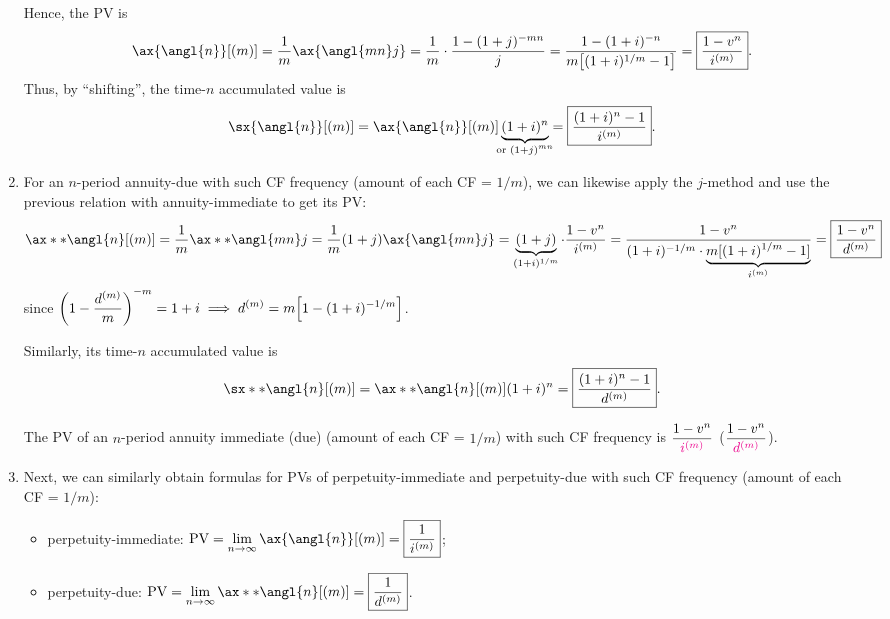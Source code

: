 \begin{enumerate}
Hence, the PV is
\[
\ax{\angl{n}}[(m)]
=\frac{1}{m}\ax{\angl{mn}j}
=\frac{1}{m}\cdot\frac{1-(1+j)^{-mn}}{j}
=\frac{1-(1+i)^{-n}}{m\qty[(1+i)^{1/m}-1]}
=\boxed{\frac{1-v^n}{i^{(m)}}}.
\]
Thus, by ``shifting'', the time-\(n\) accumulated value is
\[
\sx{\angl{n}}[(m)]
=\ax{\angl{n}}[(m)]\underbrace{(1+i)^n}_{\mathclap{\text{or }(1+j)^{mn}}}
=\boxed{\frac{(1+i)^n-1}{i^{(m)}}}.
\]
\item \label{it:pv-av-annuity-due-more-freq}
For an \(n\)-period annuity-due with such CF frequency (amount of each CF =
\(1/m\)), we can likewise apply the \(j\)-method and use the previous relation
with annuity-immediate to get its PV:
\[
\ax**{\angl{n}}[(m)]=\frac{1}{m}\ax**{\angl{mn}j}
=\frac{1}{m}(1+j)\ax{\angl{mn}j}
=\underbrace{(1+j)}_{(1+i)^{1/m}}\cdot\frac{1-v^n}{i^{(m)}}
=\frac{1-v^n}{(1+i)^{-1/m}\cdot \underbrace{m[(1+i)^{1/m}-1]}_{i^{(m)}}}
=\boxed{\frac{1-v^n}{d^{(m)}}}
\]
since \(\displaystyle \qty(1-\frac{d^{(m)}}{m})^{-m}=1+i\implies d^{(m)}=m\qty[1-(1+i)^{-1/m}]\).

Similarly, its time-\(n\) accumulated value is
\[
\sx**{\angl{n}}[(m)]=\ax**{\angl{n}}[(m)](1+i)^{n}=\boxed{\frac{(1+i)^n-1}{d^{(m)}}}.
\]
\begin{mnemonic}
The PV of an \(n\)-period annuity {\color{magenta}i}mmediate
({\color{magenta}d}ue) (amount of each CF = \(1/m\)) with such CF frequency is
\(\displaystyle \frac{1-v^n}{{\color{magenta}i^{(m)}}}\) (\(\displaystyle
\frac{1-v^n}{{\color{magenta}d^{(m)}}}\)).
\end{mnemonic}

\item \label{it:pv-perpetuities-more-freq}
Next, we can similarly obtain formulas for PVs of perpetuity-immediate and
perpetuity-due with such CF frequency (amount of each CF = \(1/m\)):
\begin{itemize}
\item perpetuity-immediate: \(\displaystyle \text{PV}=\lim_{n\to \infty}\ax{\angl{n}}[(m)]
=\boxed{\frac{1}{i^{(m)}}}\);
\item perpetuity-due: \(\displaystyle \text{PV}=\lim_{n\to \infty}\ax**{\angl{n}}[(m)]
=\boxed{\frac{1}{d^{(m)}}}\).
\end{itemize}
\end{enumerate}
